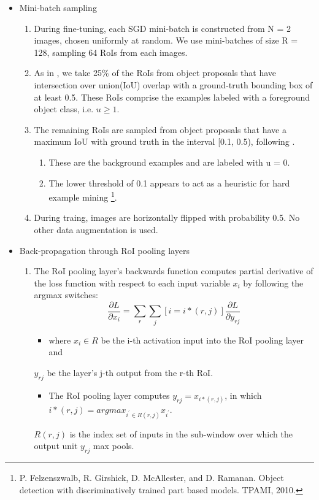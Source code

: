 \documentclass[11pt]{book}
\begin{document}
\begin{itemize}
\item Mini-batch sampling\\
\label{sec-1-1-3-2}%
\begin{enumerate}
\item During fine-tuning, each SGD mini-batch is constructed from N = 2 images, chosen uniformly
        at random. We use mini-batches of size R = 128, sampling 64 RoIs from each images.
\item As in \footnotemark[1], we take 25\% of the RoIs from object proposals that have intersection over
        union(IoU) overlap with a ground-truth bounding box of at least 0.5. These RoIs comprise
        the examples labeled with a foreground object class, i.e. $u \ge 1$.
\item The remaining RoIs are sampled from object proposals that have a maximum IoU with ground truth
        in the interval [0.1, 0.5), following \footnotemark[4].
\begin{enumerate}
\item These are the background examples and are labeled with u = 0.
\item The lower threshold of 0.1 appears to act as a heuristic for hard example mining \footnote{P.  Felzenszwalb,  R.  Girshick,  D.  McAllester,  and  D.  Ramanan.   
Object detection with discriminatively trained part based models.
TPAMI, 2010.
 }.
\end{enumerate}
\item During traing, images are horizontally flipped with probability 0.5. No other data 
        augmentation is used.
\end{enumerate}


\item Back-propagation through RoI pooling layers\\
\label{sec-1-1-3-3}%
\begin{enumerate}
\item The RoI pooling layer's backwards function computes partial derivative of the loss
        function with respect to each input variable $x_i$ by following the argmax switches:
        \begin{equation}
          \frac{\partial{L}}{\partial{x_i}} = \sum_r\sum_j[i = i*(r,j)]\frac{\partial{L}}{\partial{y_{rj}}}
        \end{equation}
\begin{itemize}
\item where $x_i\in{R}$ be the i-th activation input into the RoI pooling layer and
\end{itemize}
$y_{rj}$ be the layer's j-th output from the r-th RoI.
\begin{itemize}
\item The RoI pooling layer computes $y_{rj}=x_{i*(r,j)}$, in which $i*(r,j)=argmax_{i^{'}\in{R(r,j)}}x_{i^{'}}$.
\end{itemize}
$R(r,j)$ is the index set of inputs in the sub-window over which the output unit $y_{rj}$ 
        max pools.
\end{enumerate}



\end{itemize}
\end{document}
